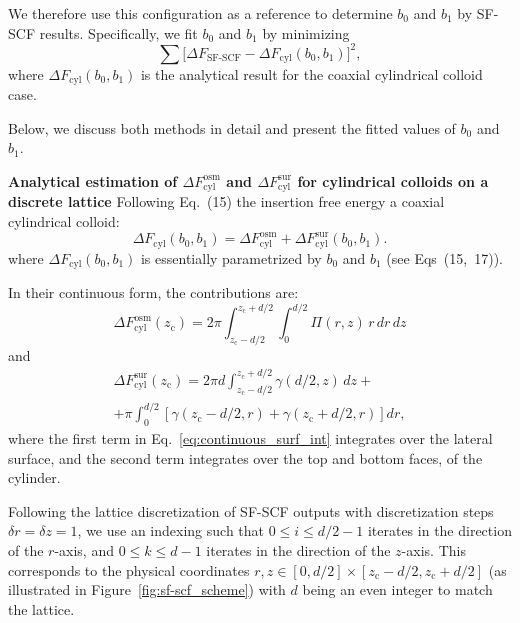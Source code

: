 \documentclass[10pt, a4paper, twocolumn]{article}
\begin{document}
We therefore use this configuration as a reference to determine $b_0$ and $b_1$ by SF-SCF results.
Specifically, we fit $b_0$ and $b_1$ by minimizing 
\begin{equation}
    \sum \bigl[\Delta F_{\text{SF-SCF}} - \Delta F_{\text{cyl}}(b_0,b_1)\bigr]^2,
    \label{eq:b0_b1_fit}
\end{equation}
where $\Delta F_{\text{cyl}}(b_0,b_1)$ is the analytical result for the coaxial cylindrical colloid case.

Below, we discuss both methods in detail and present the fitted values of $b_0$ and $b_1$.


\bigskip\noindent
\textbf{Analytical estimation of $\Delta F_{\text{cyl}}^{\text{osm}}$ and $\Delta F_{\text{cyl}}^{\text{sur}}$ for cylindrical colloids on a discrete lattice}
Following Eq.~(15) the insertion free energy a coaxial cylindrical colloid:
\begin{equation}
    \Delta F_{\text{cyl}}(b_0, b_1) = \Delta F_{\text{cyl}}^{\text{osm}} + \Delta F_{\text{cyl}}^{\text{sur}}(b_0, b_1).
\end{equation}
where $\Delta F_{\text{cyl}}(b_0, b_1)$ is essentially parametrized by $b_0$ and $b_1$ (see Eqs~(15,~17)).

In their continuous form, the contributions are:
\begin{equation}
    \Delta F_{\text{cyl}}^{\text{osm}}(z_{\text{c}}) = 2 \pi \int_{z_{\text{c}} - d/2}^{z_{\text{c}} + d/2} \int_{0}^{d/2} \Pi(r,z) \, r \, dr \, dz
\end{equation}
and
\begin{equation}\label{eq:continuous_surf_int}
    \begin{aligned}
        \Delta F_{\text{cyl}}^{\text{sur}}(z_{\text{c}}) = 2 \pi d \int_{z_{\text{c}} - d/2}^{z_{\text{c}} + d/2} \gamma(d/2,z) \, dz +\\
        + \pi \int_{0}^{d/2} \left[ \gamma(z_{\text{c}} - d/2, r) + \gamma(z_{\text{c}} + d/2,r) \right] dr,
    \end{aligned}
\end{equation}
where the first term in Eq.~\eqref{eq:continuous_surf_int} integrates over the lateral surface, and the second term integrates over the top and bottom faces, of the cylinder.

Following the lattice discretization of SF-SCF outputs with discretization steps $\delta r = \delta z = 1$, we use an indexing such that $0 \le i \le d/2-1$ iterates in the direction of the $r$-axis, and $0 \le k \le d-1$ iterates in the direction of the $z$-axis.
This corresponds to the physical coordinates $r,z \in [0, d/2]\times[z_{\text{c}} - d/2, z_{\text{c}} + d/2]$ (as illustrated in Figure~\ref{fig:sf-scf_scheme}) with $d$ being an even integer to match the lattice.
\end{document}
